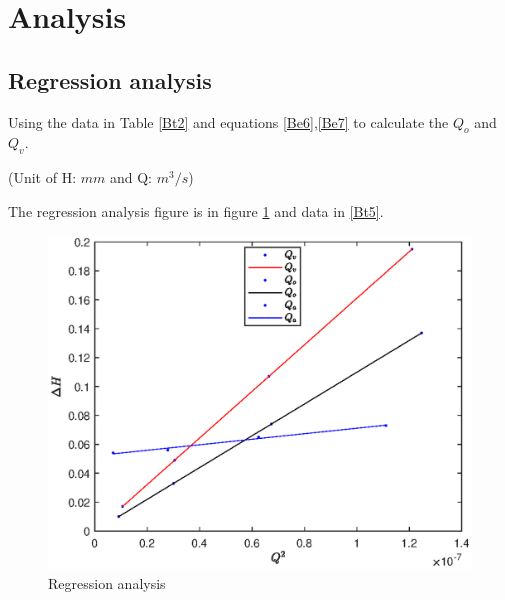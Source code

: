 \section{Analysis}
\label{sec:analysis}
\subsection{Regression analysis}

Using the data in Table \ref{Bt2} and equations \eqref{Be6},\eqref{Be7} to calculate the $Q_o$ and $Q_v$.


\begin{table}[h]
    \centering

(Unit of H: $mm$ and Q: $m^3/s$)
\caption{Flow rates measured by different methods}
\label{Bt4}
\end{table}

The regression analysis figure is in figure \ref{Bf4} and data in \ref{Bt5}.

\begin{figure}[h] %
    \centering
    \includegraphics[scale=1.1]{Results/B.eps}
    \caption{Regression analysis}
    \label{Bf4}
\end{figure}

